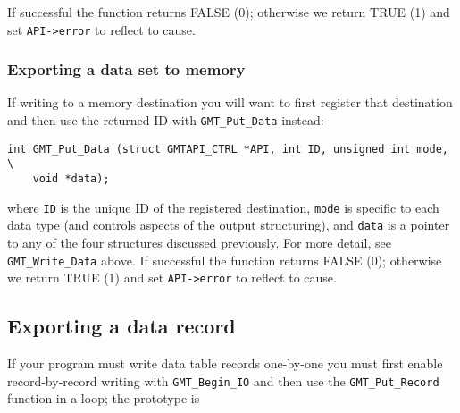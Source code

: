 \documentclass[11pt]{report}
\begin{document}
If successful the function returns FALSE (0); otherwise we return TRUE (1) and set \texttt{API->error} to reflect to cause.

\subsubsection{Exporting a data set to memory}

If writing to a memory destination you will want to first register that destination and then use the returned ID with
\texttt{GMT\_Put\_Data} instead:

\begin{verbatim}
int GMT_Put_Data (struct GMTAPI_CTRL *API, int ID, unsigned int mode, \
	void *data);
\end{verbatim}
where \texttt{ID} is the unique ID of the registered destination, \texttt{mode}
is specific to each data type (and controls aspects of the output structuring),
and \texttt{data} is a pointer to any of the four structures
discussed previously.  For more detail, see \texttt{GMT\_Write\_Data} above.
If successful the function returns FALSE (0); otherwise we return TRUE (1) and set \texttt{API->error} to reflect to cause.


\subsection{Exporting a data record}

If your program must write data table records one-by-one you must first enable record-by-record
writing with \texttt{GMT\_Begin\_IO} and then use the \texttt{GMT\_Put\_Record} function in a loop;
the prototype is
\end{document}
